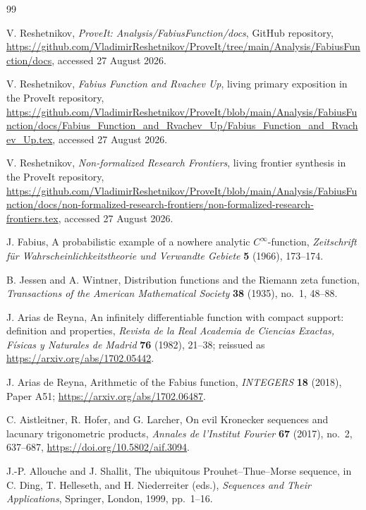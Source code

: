 \documentclass[11pt,a4paper]{article}
\theoremstyle{frontier}
\theoremstyle{definition}
\begin{document}
\begin{thebibliography}{99}

V. Reshetnikov,
\emph{ProveIt: Analysis/FabiusFunction/docs}, GitHub repository,
\url{https://github.com/VladimirReshetnikov/ProveIt/tree/main/Analysis/FabiusFunction/docs},
accessed 27 August 2026.

V. Reshetnikov,
\emph{Fabius Function and Rvachev Up}, living primary exposition in the ProveIt repository,
\url{https://github.com/VladimirReshetnikov/ProveIt/blob/main/Analysis/FabiusFunction/docs/Fabius_Function_and_Rvachev_Up/Fabius_Function_and_Rvachev_Up.tex},
accessed 27 August 2026.

V. Reshetnikov,
\emph{Non-formalized Research Frontiers}, living frontier synthesis in the ProveIt repository,
\url{https://github.com/VladimirReshetnikov/ProveIt/blob/main/Analysis/FabiusFunction/docs/non-formalized-research-frontiers/non-formalized-research-frontiers.tex},
accessed 27 August 2026.

J. Fabius,
A probabilistic example of a nowhere analytic $C^\infty$-function,
\emph{Zeitschrift f\"ur Wahrscheinlichkeitstheorie und Verwandte Gebiete}
\textbf{5} (1966), 173--174.

B. Jessen and A. Wintner,
Distribution functions and the Riemann zeta function,
\emph{Transactions of the American Mathematical Society}
\textbf{38} (1935), no.~1, 48--88.

J. Arias de Reyna,
An infinitely differentiable function with compact support: definition and properties,
\emph{Revista de la Real Academia de Ciencias Exactas, F\'isicas y Naturales de Madrid}
\textbf{76} (1982), 21--38;
reissued as \url{https://arxiv.org/abs/1702.05442}.

J. Arias de Reyna,
Arithmetic of the Fabius function,
\emph{INTEGERS} \textbf{18} (2018), Paper A51;
\url{https://arxiv.org/abs/1702.06487}.

C. Aistleitner, R. Hofer, and G. Larcher,
On evil Kronecker sequences and lacunary trigonometric products,
\emph{Annales de l'Institut Fourier} \textbf{67} (2017), no.~2, 637--687,
\url{https://doi.org/10.5802/aif.3094}.

J.-P. Allouche and J. Shallit,
The ubiquitous Prouhet--Thue--Morse sequence,
in C. Ding, T. Helleseth, and H. Niederreiter (eds.),
\emph{Sequences and Their Applications}, Springer, London, 1999, pp.~1--16.


\end{thebibliography}
\end{document}

